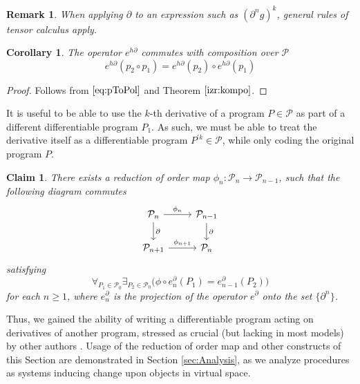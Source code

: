 \documentclass{article}
\newcommand{\dP}{\mathcal{P}}
\newcommand{\D}{\partial}
\newtheorem{trditev}{Claim}[section]
\newtheorem{opomba}{Remark}[section]
\newtheorem{corollary}{Corollary}[section]
\begin{document}
 \begin{opomba}
 When applying $\D$ to an expression such as $(\D^n g)^k$, general rules of tensor calculus apply. 
 \end{opomba}
 
   \begin{corollary}\label{izr:komp_homo}
   The operator $e^{h\D}$ commutes with composition over $\dP$
   \begin{equation}
   e^{h\D}(p_2\circ p_1)=e^{h\D}(p_2)\circ e^{h\D}(p_1)
   \end{equation}
   \end{corollary}
   
   \begin{proof}
   Follows from $\eqref{eq:pToPol}$ and Theorem $\ref{izr:kompo}$.
   \end{proof}
 
 It is useful to be able to use the $k$-th derivative of a program $P\in\dP$ as part of a different differentiable program $P_1$. As such, we must be able to treat the derivative itself as a differentiable program $P^{\prime k}\in\dP$, while only coding the original program $P$. 
\begin{trditev}\label{izr:reductionMap}
There exists a reduction of order map $\phi_n:\dP_n\to \dP_{n-1}$, such that the
following  diagram commutes
\begin{equation}\label{eq:reductionMap}
\begin{tikzcd}
  \dP_n \arrow{r}{\phi_n} \arrow{d}{\D} & 
  \dP_{n-1} \arrow{d}{\D}\\
  \dP_{n+1} 
  \arrow{r}{\phi_{n+1}}& \dP_{n}
\end{tikzcd}
\end{equation}
satisfying
\begin{equation}
\forall_{P_1\in\dP_0}\exists_{P_2\in\dP_0}\Big(\phi\circ e^\D_n(P_1)=e^\D_{n-1}(P_2)\Big)
\end{equation}
for each $n\ge 1$, where $e^\D_n$ is the projection of the operator $e^\D$ onto the set $\{\D^n\}$.
\end{trditev}      
 Thus, we gained the ability of writing a differentiable program acting on derivatives of another program, stressed as crucial (but lacking in most models) by other authors \cite{AD1}. Usage of the reduction of order map and other constructs of this Section are demonstrated in Section \ref{sec:Analysis}, as we analyze procedures as systems inducing change upon objects in virtual space.
 
\end{document}
